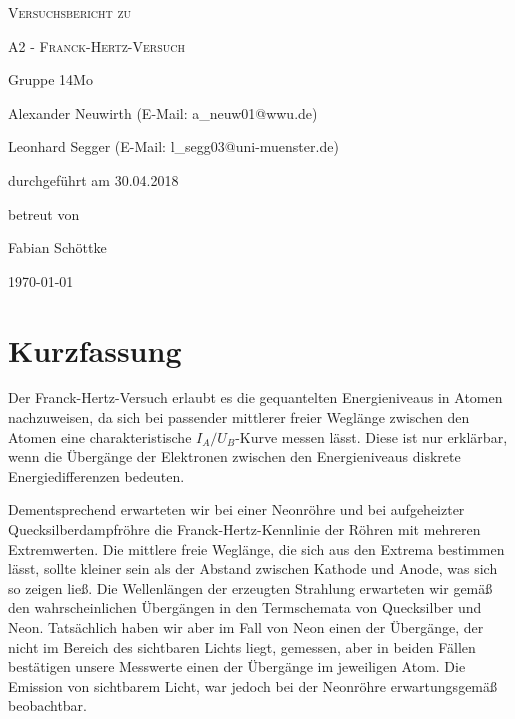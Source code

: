 \documentclass[
	a4paper,
	12pt,
	pagesize,
	ngerman
]{scrartcl}
\begin{document}
	
	\begin{titlepage}
		\centering
		{\scshape\LARGE Versuchsbericht zu \par}
		\vspace{1cm}
		{\scshape\huge A2 - Franck-Hertz-Versuch \par} 
		\vspace{2.5cm}
		{\LARGE Gruppe 14Mo \par}
		\vspace{0.5cm}
		
		{\large Alexander Neuwirth (E-Mail: a\_neuw01@wwu.de) \par}
		{\large Leonhard Segger (E-Mail: l\_segg03@uni-muenster.de) \par}
		\vfill
		
		durchgeführt am 30.04.2018\par
		betreut von\par
		{\large Fabian Schöttke}
		
		\vfill
		
		{\large \today\par}
	\end{titlepage}
	\tableofcontents
	\newpage


	\section{Kurzfassung}
	Der Franck-Hertz-Versuch erlaubt es die gequantelten Energieniveaus in Atomen nachzuweisen, da sich bei passender mittlerer freier Weglänge zwischen den Atomen eine charakteristische $I_A/U_B$-Kurve messen lässt.
	Diese ist nur erklärbar, wenn die Übergänge der Elektronen zwischen den Energieniveaus diskrete Energiedifferenzen bedeuten.
	
	Dementsprechend erwarteten wir bei einer Neonröhre und bei aufgeheizter Quecksilberdampfröhre die Franck-Hertz-Kennlinie der Röhren mit mehreren Extremwerten.
	Die mittlere freie Weglänge, die sich aus den Extrema bestimmen lässt, sollte kleiner sein als der Abstand zwischen Kathode und Anode, was sich so zeigen ließ.
	Die Wellenlängen der erzeugten Strahlung erwarteten wir gemäß den wahrscheinlichen Übergängen in den Termschemata von Quecksilber und Neon.
	Tatsächlich haben wir aber im Fall von Neon einen der Übergänge, der nicht im Bereich des sichtbaren Lichts liegt, gemessen, aber in beiden Fällen bestätigen unsere Messwerte einen der Übergänge im jeweiligen Atom.
	Die Emission von sichtbarem Licht, war jedoch bei der Neonröhre erwartungsgemäß beobachtbar.
	
\end{document}
